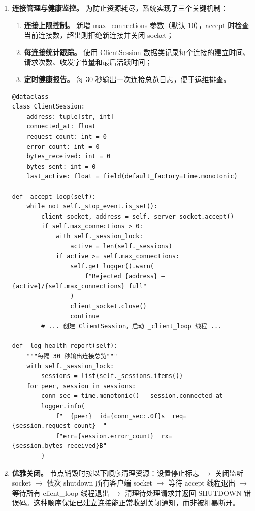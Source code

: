 \documentclass[12pt]{article}
\newcommand{\code}[1]{{\ttfamily #1}}
\begin{document}
\begin{enumerate}
\begin{lstlisting}[caption={服务端多线程 TCP 接收模型},label={lst:tcp-server-model}]
    def _client_loop(self, client_socket, address):
        while not self._stop_event.is_set():
            request, attachment = receive_message(client_socket)
            response = self._handle_request(request, request_id, attachment)
            send_json_message(client_socket, response)
\end{lstlisting}

	\item \textbf{连接管理与健康监控。} 为防止资源耗尽，系统实现了三个关键机制：

	      \begin{enumerate}
		      \item \textbf{连接上限控制。} 新增 \code{max\_connections} 参数（默认 10），accept 时检查当前连接数，超出则拒绝新连接并关闭 socket；
		      \item \textbf{每连接统计跟踪。} 使用 \code{ClientSession} 数据类记录每个连接的建立时间、请求次数、收发字节量和最后活跃时间；
		      \item \textbf{定时健康报告。} 每 30 秒输出一次连接总览日志，便于运维排查。
	      \end{enumerate}

	      \begin{lstlisting}[caption={连接管理与会话跟踪},label={lst:connection-mgmt}]
@dataclass
class ClientSession:
    address: tuple[str, int]
    connected_at: float
    request_count: int = 0
    error_count: int = 0
    bytes_received: int = 0
    bytes_sent: int = 0
    last_active: float = field(default_factory=time.monotonic)

def _accept_loop(self):
    while not self._stop_event.is_set():
        client_socket, address = self._server_socket.accept()
        if self.max_connections > 0:
            with self._session_lock:
                active = len(self._sessions)
            if active >= self.max_connections:
                self.get_logger().warn(
                    f"Rejected {address} — {active}/{self.max_connections} full"
                )
                client_socket.close()
                continue
        # ... 创建 ClientSession，启动 _client_loop 线程 ...

def _log_health_report(self):
    """每隔 30 秒输出连接总览"""
    with self._session_lock:
        sessions = list(self._sessions.items())
    for peer, session in sessions:
        conn_sec = time.monotonic() - session.connected_at
        logger.info(
            f"  {peer}  id={conn_sec:.0f}s  req={session.request_count}  "
            f"err={session.error_count}  rx={session.bytes_received}B"
        )
\end{lstlisting}

	\item \textbf{优雅关闭。} 节点销毁时按以下顺序清理资源：设置停止标志 $\to$ 关闭监听 socket $\to$ 依次 shutdown 所有客户端 socket $\to$ 等待 accept 线程退出 $\to$ 等待所有 client\_loop 线程退出 $\to$ 清理待处理请求并返回 \code{SHUTDOWN} 错误码。这种顺序保证已建立连接能正常收到关闭通知，而非被粗暴断开。
\end{enumerate}
\end{document}
